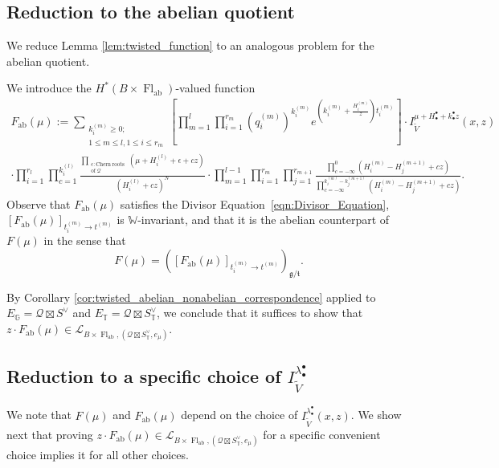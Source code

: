 \documentclass[a4paper,12pt]{amsart}
\numberwithin{equation}{section}
\theoremstyle{definition}
\newcommand{\G}{\mathbb{G}}
\newcommand{\T}{\mathbb{T}}
\newcommand{\W}{\mathbb{W}}
\newcommand{\cL}{\mathcal{L}}
\newcommand{\gt}{{\mathfrak{g}/\mathfrak{t}}}
\newcommand{\Fab}{F_{\operatorname{ab}}}
\newcommand{\FlT}{\operatorname{Fl}_{\operatorname{ab}}}
\begin{document}
\subsection{Reduction to the abelian quotient}\label{reduction1}
We reduce Lemma \ref{lem:twisted_function} to an analogous problem for the abelian quotient.

We introduce the $H^*(B\times\FlT)$-valued function 
\begin{multline}\label{eqn:F_T(mu)}
    \Fab(\mu) := \sum_{ \substack{k_i^{(m)}\geq0; \\ 1\leq m\leq l,  1\leq i\leq r_m} } \left[ \prod_{m=1}^l \prod_{i=1}^{r_m} (q^{(m)}_i)^{k^{(m)}_i}e^{\left(k^{(m)}_i+\frac{H^{(m)}_i}{z}\right)t^{(m)}_i} \right] \cdot I^{\mu+H_\bullet^\bullet+k_\bullet^\bullet z}_{\widetilde{V}}(x,z) \\ 
    \cdot \prod_{i=1}^{r_l}\prod_{c=1}^{k_i^{(l)}}\frac{ \prod_{ \substack{\epsilon\colon\mathrm{Chern\ roots} \\ \mathrm{of\ } \mathcal{Q}} } (\mu+H_i^{(l)}+\epsilon+cz) }{(H_i^{(l)}+cz)^N} \cdot \prod_{m=1}^{l-1}\prod_{i=1}^{r_m}\prod_{j=1}^{r_{m+1}}\frac{\prod_{c=-\infty}^{0}(H_i^{(m)}-H_j^{(m+1)}+cz)}{\prod_{c=-\infty}^{k_i^{(m)}-k_j^{(m+1)}}(H_i^{(m)}-H_j^{(m+1)}+cz)}.
\end{multline}
Observe that $\Fab(\mu)$ satisfies the Divisor Equation~\eqref{eqn:Divisor_Equation}, $[ \Fab(\mu) ]_{t^{(m)}_i\to t^{(m)}}$ is $\W$-invariant, and that it is the abelian counterpart of $F(\mu)$ in the sense that
\begin{equation}\label{eqn:F(mu)-F_T(mu)}
    F(\mu) = \left( \left[ \Fab(\mu) \right]_{t^{(m)}_i\to t^{(m)}} \right)_\gt.
\end{equation}

By Corollary \ref{cor:twisted_abelian_nonabelian_correspondence} applied to $E_\G=\mathcal{Q}\boxtimes S^\vee$ and $E_\T=\mathcal{Q}\boxtimes S^\vee_\T$, we conclude that it suffices to show that $z\cdot \Fab(\mu)\in\cL_{B\times\FlT,(\mathcal{Q}\boxtimes S^\vee_\T,e_\mu)}$.

\subsection{Reduction to a specific choice of $I_{\widetilde{V}}^{\lambda_\bullet^\bullet}$} 
\label{reduction2}
We note that $F(\mu)$ and $\Fab(\mu)$ depend on the choice of $I_{\widetilde{V}}^{\lambda_\bullet^\bullet}(x,z)$. We show next that proving $z\cdot \Fab(\mu)\in\cL_{B\times\FlT,(\mathcal{Q}\boxtimes S^\vee_\T,e_\mu)}$ for a specific convenient choice implies it for all other choices.   
\end{document}
